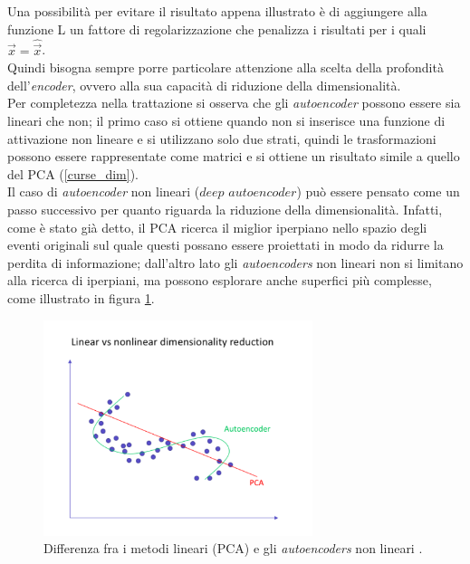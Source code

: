 Una possibilità per evitare il risultato appena illustrato è di aggiungere alla funzione L un fattore di regolarizzazione che penalizza i risultati per i quali $\vec{x} = \hat{\vec{x}}$. \\
Quindi bisogna sempre porre particolare attenzione alla scelta della profondità dell'\textit{encoder}, ovvero alla sua capacità di riduzione della dimensionalità. \\
Per completezza nella trattazione si osserva che gli \textit{autoencoder} possono essere sia lineari che non; il primo caso si ottiene quando non si inserisce una funzione di attivazione non lineare e si utilizzano solo due strati, quindi le trasformazioni possono essere rappresentate come matrici e si ottiene un risultato simile a quello del PCA (\ref{curse_dim}). \\
Il caso di \textit{autoencoder} non lineari ($\textit{deep autoencoder}$) può essere pensato come un passo successivo per quanto riguarda la riduzione della dimensionalità. Infatti, come è stato già detto, il PCA ricerca il miglior iperpiano nello spazio degli eventi originali sul quale questi possano essere proiettati in modo da ridurre la perdita di informazione; dall'altro lato gli \textit{autoencoders} non lineari non si limitano alla ricerca di iperpiani, ma possono esplorare anche superfici più complesse, come illustrato in figura \ref{autoencoder_non_lineari}.

\begin{figure}[h!]
	\centering
	\includegraphics[width=0.70\textwidth]{figs/Autoencoder_non_lineari.png}
	\caption{Differenza fra i metodi lineari (PCA) e gli \textit{autoencoders} non lineari \cite{Autoencoders}.}
	\label{autoencoder_non_lineari}
\end{figure}


\newpage


